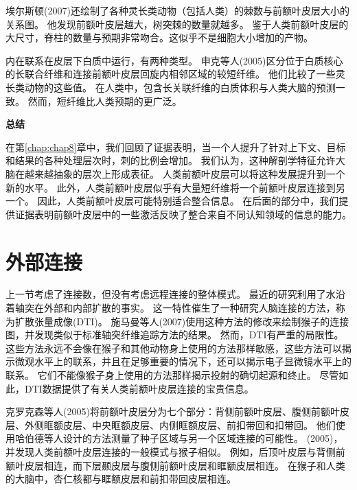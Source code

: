 埃尔斯顿(2007)还绘制了各种灵长类动物（包括人类）的棘数与前额叶皮层大小的关系图。
他发现前额叶皮层越大，树突棘的数量就越多。
鉴于人类前额叶皮层的大尺寸，脊柱的数量与预期非常吻合。这似乎不是细胞大小增加的产物。
\par


内在联系在皮层下白质中运行，有两种类型。
申克等人(2005)区分位于白质核心的长联合纤维和连接前额叶皮层回旋内相邻区域的较短纤维。
他们比较了一些灵长类动物的这些值。
在人类中，包含长关联纤维的白质体积与人类大脑的预测一致。
然而，短纤维比人类预期的更广泛。
\par



\textbf{总结}
\par

在第\ref{chap:chap8}章中，我们回顾了证据表明，当一个人提升了针对上下文、目标和结果的各种处理层次时，刺的比例会增加。
我们认为，这种解剖学特征允许大脑在越来越抽象的层次上形成表征。
人类前额叶皮层可以将这种发展提升到一个新的水平。
此外，人类前额叶皮层似乎有大量短纤维将一个前额叶皮层连接到另一个。
因此，人类前额叶皮层可能特别适合整合信息。
在后面的部分中，我们提供证据表明前额叶皮层中的一些激活反映了整合来自不同认知领域的信息的能力。



\section{外部连接}

上一节考虑了连接数，但没有考虑远程连接的整体模式。
最近的研究利用了水沿着轴突在外部和内部扩散的事实。
这一特性催生了一种研究人脑连接的方法，称为扩散张量成像(DTI)。
施马曼等人(2007)使用这种方法的修改来绘制猴子的连接图，并发现类似于标准轴突纤维追踪方法的结果。
然而，DTI有严重的局限性。
这些方法永远不会像在猴子和其他动物身上使用的方法那样敏感，这些方法可以揭示微观水平上的联系，并且在足够重要的情况下，还可以揭示电子显微镜水平上的联系。
它们不能像猴子身上使用的方法那样揭示投射的确切起源和终止。
尽管如此，DTI数据提供了有关人类前额叶皮层连接的宝贵信息。
\par


克罗克森等人(2005)将前额叶皮层分为七个部分：背侧前额叶皮层、腹侧前额叶皮层、外侧眶额皮层、中央眶额皮层、内侧眶额皮层、前扣带回和扣带回。
他们使用哈伯德等人设计的方法测量了种子区域与另一个区域连接的可能性。
(2005)，并发现人类前额叶皮层连接的一般模式与猴子相似。
例如，后顶叶皮层与背侧前额叶皮层相连，而下层颞皮层与腹侧前额叶皮层和眶额皮层相连。
在猴子和人类的大脑中，杏仁核都与眶额皮层和前扣带回皮层相连。
\par


